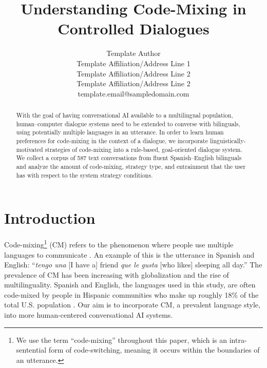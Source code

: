 \documentclass[11pt,a4paper]{article}
\title{Understanding Code-Mixing in Controlled Dialogues}
\author{
 Template Author\Thanks{The {\em actual} contributors to this instruction
 document and corresponding template file are given in Section
 \ref{sec:contributors}.} \\
 Template Affiliation/Address Line 1 \\
 Template Affiliation/Address Line 2 \\
 Template Affiliation/Address Line 2 \\
  {\sf template.email@sampledomain.com} \\
}
\date{}
\newcommand{\red}[1]{\textcolor{red}{#1}}
\begin{document}
\maketitle
\begin{abstract}
With the goal of having conversational AI available to a multilingual population, human--computer dialogue systems need to be extended to converse with bilinguals, using potentially multiple languages in an utterance.
In order to learn human preferences for code-mixing in the context of a dialogue, we incorporate linguistically-motivated strategies of code-mixing into a rule-based, goal-oriented dialogue system.
We collect a corpus of 587 text conversations from fluent Spanish--English bilinguals and analyze the amount of code-mixing, strategy type, and entrainment that the user has with respect to the system strategy conditions.

\end{abstract}

\section{Introduction}

Code-mixing\footnote{We use the term ``code-mixing'' throughout this paper, which is an intra-sentential form of code-switching, meaning it occurs within the boundaries of an utterance.} (CM) refers to the phenomenon where people use multiple languages to communicate \citep{sankoff1981formal}.
An example of this is the utterance in Spanish and English: ``\textit{tengo una} [I have a] friend \textit{que le gusta} [who likes] sleeping all day.'' 
The prevalence of CM has been increasing with globalization and the rise of multilinguality.
Spanish and English, the languages used in this study, are often code-mixed by people in Hispanic communities who make up roughly 18\% of the total U.S. population \citep{census2017}.
Our aim is to incorporate CM, a prevalent language style, into more human-centered conversational AI systems.
\end{document}
